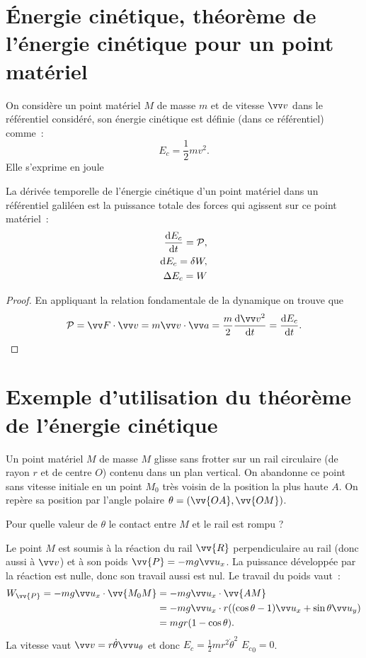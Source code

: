 \section{Énergie cinétique, théorème de l'énergie cinétique pour un point matériel}
\label{chap4-sec:ernergiecinetique}

\begin{defdef}
  On considère un point matériel $M$ de masse $m$ et de vitesse $\vvv$ dans le référentiel considéré, son énergie cinétique est définie (dans ce référentiel) comme~:
  \begin{equation}
    E_c = \frac{1}{2} m v^2.
  \end{equation}
  Elle s'exprime en joule
\end{defdef}
\begin{theo}
  La dérivée temporelle de l'énergie cinétique d'un point matériel dans un référentiel galiléen est la puissance totale des forces qui agissent sur ce point matériel~:
  \begin{align}
    \dfrac{\mathrm{d} E_c}{\mathrm{d} t} = \mathcal{P}, \\
    \mathop{}\mathopen{}\mathrm{d} E_c = \delta W, \\
    \Delta E_c = W
  \end{align}
\end{theo}
\begin{proof}
  En appliquant la relation fondamentale de la dynamique on trouve que
  \begin{equation}
    \P = \vF \cdot \vvv = m \vvv \cdot \va = \frac{m}{2} \derived{\vvv^2}{t} = \derived{E_c}{t}.
  \end{equation}
\end{proof}

\section{Exemple d'utilisation du théorème de l'énergie cinétique}
\label{chap4-sec:exempletheoremeenergiecinetique}

Un point matériel $M$ de masse $M$ glisse sans frotter sur un rail circulaire (de rayon $r$ et de centre $O$) contenu dans un plan vertical. On abandonne ce point sans vitesse initiale en un point $M_0$ très voisin de la position la plus haute $A$. On repère sa position par l'angle polaire $\theta = (\vv{OA}, \vv{OM})$. 

Pour quelle valeur de $\theta$ le contact entre $M$ et le rail est rompu ?

Le point $M$ est soumis à la réaction du rail $\vv{R}$ perpendiculaire au rail (donc aussi à $\vvv$) et à son poids $\vv{P} = -mg\ux$.  La puissance développée par la réaction est nulle, donc son travail aussi est nul. Le travail du poids vaut~:
\begin{align}
  W_{\vv{P}} = -mg\ux \cdot \vv{M_0M} &= -mg\ux \cdot \vv{AM} \\
  &= -mg\ux \cdot r((\cos\theta -1)\ux + \sin\theta \uy) \\
  &=mgr(1-\cos\theta).
\end{align}
La vitesse vaut $\vvv = r\dot{\theta} \utheta$ et donc $E_c = \frac{1}{2}mr^2\dot{\theta}^2$ ${E_c}_{0}=0$. 


